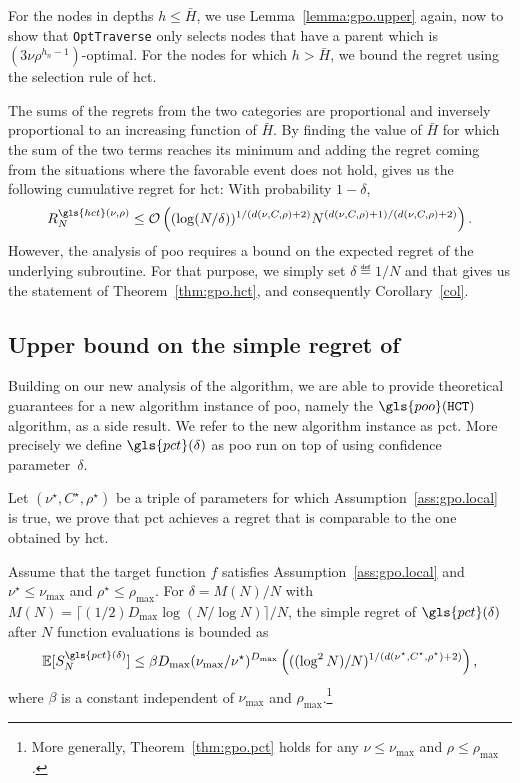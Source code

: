For the nodes in depths $h \leq \bar H$, we  use
Lemma~\ref{lemma:gpo.upper} again, now to show that \texttt{OptTraverse} only selects nodes
that have a parent which is $(3\nu\rho^{h_n-1})$-optimal.
For the nodes for which  $h > \bar H$, we bound the regret using the
selection rule of \gls{hct}.

The sums of the regrets from the two categories are proportional
and inversely proportional to an increasing function of $\bar H$.
By finding the value of $\bar H$ for which the sum of the two
terms reaches its minimum and adding the regret coming
from the situations where the favorable event does not hold,
gives us the following cumulative regret for \gls{hct}: With probability $1-\delta$,
\[
	R_N^{\gls{hct}(\nu,\rho)} \leq \cO\left( (\log(N/\delta))^{1/(d(\nu,C,\rho)+2)}N^{(d(\nu,C,\rho)+1)/(d(\nu,C,\rho)+2)} \right).
\]
However, the analysis of \gls{poo} requires a bound on the expected regret of the underlying subroutine. For that purpose, we simply set $\delta \eqdef 1/N$ and that gives us the statement of Theorem~\ref{thm:gpo.hct}, and consequently Corollary~\ref{col}.

\subsection{Upper bound on the simple regret of \PCT{}}

Building on our new analysis of the \HCT{} algorithm, we are able to provide theoretical guarantees for a new algorithm instance of \gls{poo}, namely the $\gls{poo}(\HCT)$ algorithm, as a side result. We refer to the new algorithm instance as \gls{pct}. More precisely we define $\gls{pct}(\delta)$ as \gls{poo} run on top of \HCT using confidence parameter~$\delta$.

Let $(\nu^\star,C^\star,\rho^\star)$ be a triple of parameters for which Assumption~\ref{ass:gpo.local} is true, we prove that \gls{pct} achieves a regret that is comparable to the one obtained by \gls{hct}.


\begin{theorem}\label{thm:gpo.pct}
\begin{leftbar}[theorembar]
Assume that the target function $f$ satisfies Assumption~\ref{ass:gpo.local} and $\nu^\star \leq \nu_{\max}$ and $\rho^\star \leq \rho_{\max}$. For $\delta = M(N)/N$ with $M(N) = \lceil (1/2)D_{\max}\log(N/\log N)\rceil/N$, the simple regret of $\gls{pct}(\delta)$ after $N$ function evaluations is bounded as
\[
	\mathbb{E}[S_N^{\gls{pct}(\delta)}]  \leq \beta D_{\max}(\nu_{\max}/\nu^\star)^{D_{\max}} \left( ((\log^2 N)/N)^{1/(d(\nu^{\star},C^\star,\rho^{\star})+2)} \right),
\]
where $\beta$ is a constant independent of $\nu_{\max}$ and $\rho_{\max}$.\footnote{More generally, Theorem~\ref{thm:gpo.pct} holds for any $\nu \leq \nu_{\max}$ and $\rho \leq \rho_{\max}$.}
\end{leftbar}
\end{theorem}

